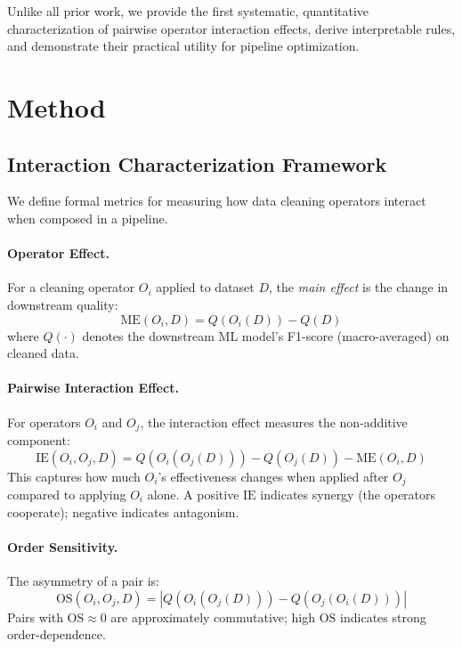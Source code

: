 \documentclass[preprint]{article}
\newcommand{\ie}{\text{IE}}
\newcommand{\os}{\text{OS}}
\newcommand{\me}{\text{ME}}
\newcommand{\quality}{Q}
\begin{document}
Unlike all prior work, we provide the first systematic, quantitative characterization of pairwise operator interaction effects, derive interpretable rules, and demonstrate their practical utility for pipeline optimization.

\section{Method}
\label{sec:method}

\subsection{Interaction Characterization Framework}

We define formal metrics for measuring how data cleaning operators interact when composed in a pipeline.

\paragraph{Operator Effect.} For a cleaning operator $O_i$ applied to dataset $D$, the \emph{main effect} is the change in downstream quality:
\begin{equation}
\me(O_i, D) = \quality(O_i(D)) - \quality(D)
\end{equation}
where $\quality(\cdot)$ denotes the downstream ML model's F1-score (macro-averaged) on cleaned data.

\paragraph{Pairwise Interaction Effect.} For operators $O_i$ and $O_j$, the interaction effect measures the non-additive component:
\begin{equation}
\ie(O_i, O_j, D) = \quality(O_i(O_j(D))) - \quality(O_j(D)) - \me(O_i, D)
\label{eq:ie}
\end{equation}
This captures how much $O_i$'s effectiveness changes when applied after $O_j$ compared to applying $O_i$ alone. A positive $\ie$ indicates synergy (the operators cooperate); negative indicates antagonism.

\paragraph{Order Sensitivity.} The asymmetry of a pair is:
\begin{equation}
\os(O_i, O_j, D) = |\quality(O_i(O_j(D))) - \quality(O_j(O_i(D)))|
\end{equation}
Pairs with $\os \approx 0$ are approximately commutative; high $\os$ indicates strong order-dependence.
\end{document}
